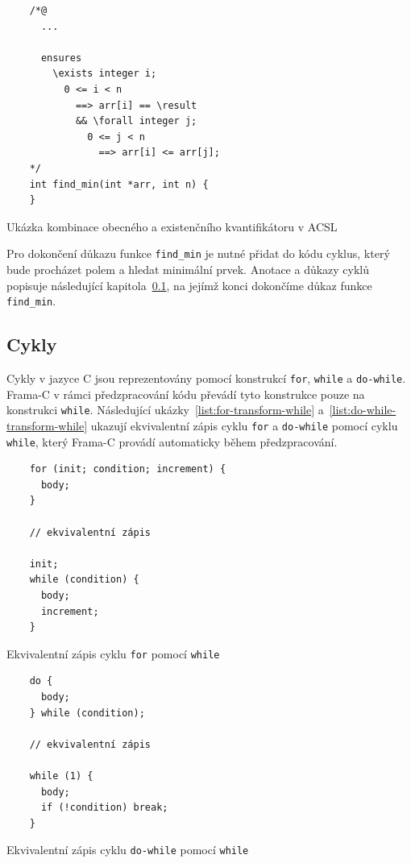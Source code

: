 \begin{listing}[H]
    \begin{verbatim}
    /*@
      ...

      ensures
        \exists integer i;
          0 <= i < n
            ==> arr[i] == \result
            && \forall integer j;
              0 <= j < n
                ==> arr[i] <= arr[j];
    */
    int find_min(int *arr, int n) {
    }
    \end{verbatim}
    \caption{Ukázka kombinace obecného a existenčního kvantifikátoru v ACSL}
    \label{list:acsl-exists-forall}
\end{listing}

Pro dokončení důkazu funkce \texttt{find\_min} je nutné přidat do kódu cyklus,
který bude procházet polem a hledat minimální prvek.
Anotace a důkazy cyklů popisuje následující kapitola~\ref{subsec:acsl-cykly},
na jejímž konci dokončíme důkaz funkce \texttt{find\_min}.

\subsection{Cykly}
\label{subsec:acsl-cykly}

Cykly v jazyce C jsou reprezentovány pomocí konstrukcí \texttt{for}, \texttt{while} a \texttt{do-while}.
Frama\mbox{-}C v rámci předzpracování kódu převádí tyto konstrukce pouze na konstrukci \texttt{while}.
Následující ukázky~\ref{list:for-transform-while} a~\ref{list:do-while-transform-while}
ukazují ekvivalentní zápis cyklu \texttt{for} a \texttt{do-while} pomocí cyklu \texttt{while},
který Frama\mbox{-}C provádí automaticky během předzpracování.

\begin{listing}[H]
    \begin{verbatim}
    for (init; condition; increment) {
      body;
    }

    // ekvivalentní zápis

    init;
    while (condition) {
      body;
      increment;
    }
    \end{verbatim}
    \caption{Ekvivalentní zápis cyklu \texttt{for} pomocí \texttt{while}}
    \label{list:for-transform-while}
\end{listing}

\begin{listing}[H]
    \begin{verbatim}
    do {
      body;
    } while (condition);

    // ekvivalentní zápis

    while (1) {
      body;
      if (!condition) break;
    }
    \end{verbatim}
    \caption{Ekvivalentní zápis cyklu \texttt{do-while} pomocí \texttt{while}}
    \label{list:do-while-transform-while}
\end{listing}

